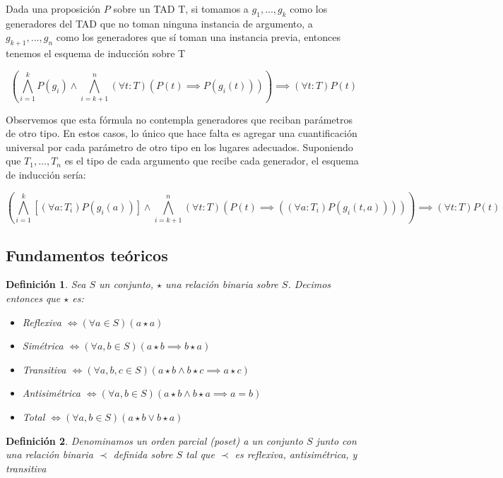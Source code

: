 \documentclass[10pt,a4paper,notitlepage]{article}
\newtheorem{deftn}{Definición}
\begin{document}
Dada una proposición $P$ sobre un TAD T, si tomamos a $g_1, ..., g_k$ como los generadores del TAD que no toman ninguna instancia de argumento, a $g_{k+1}, ..., g_n$ como los generadores que sí toman una instancia previa, entonces tenemos el esquema de inducción sobre T

$$(\bigwedge_{i=1}^k P(g_i) \wedge \bigwedge_{i=k+1}^n (\forall t : T) (P(t) \implies P(g_i(t)))) \implies (\forall t : T) P(t)$$

Observemos que esta fórmula no contempla generadores que reciban parámetros de otro tipo. En estos casos, lo único que hace falta es agregar una cuantificación universal por cada parámetro de otro tipo en los lugares adecuados. Suponiendo que $T_1, ..., T_n$ es el tipo de cada argumento que recibe cada generador, el esquema de inducción sería:

$$(\bigwedge_{i=1}^k [(\forall a : T_i) P(g_i(a))] \wedge \bigwedge_{i=k+1}^n (\forall t : T) (P(t) \implies ((\forall a : T_i) P(g_i(t, a))))) \implies (\forall t : T) P(t)$$

\subsection{Fundamentos teóricos}

\begin{deftn}
Sea $S$ un conjunto, $\star$ una relación binaria sobre $S$. Decimos entonces que $\star$ es:

\begin{itemize}
\item Reflexiva $\iff (\forall a \in S) (a \star a)$
\item Simétrica $\iff (\forall a, b \in S) (a \star b \implies b \star a)$
\item Transitiva $\iff (\forall a, b, c \in S) (a \star b \wedge b \star c \implies a \star c)$
\item Antisimétrica $\iff (\forall a, b \in S) (a \star b \wedge b \star a \implies a = b)$
\item Total $\iff (\forall a, b \in S) (a \star b \vee b \star a)$
\end{itemize}
\end{deftn}

\begin{deftn}
Denominamos un orden parcial (poset) a un conjunto $S$ junto con una relación binaria $\prec$ definida sobre $S$ tal que $\prec$ es reflexiva, antisimétrica, y transitiva
\end{deftn}
\end{document}
